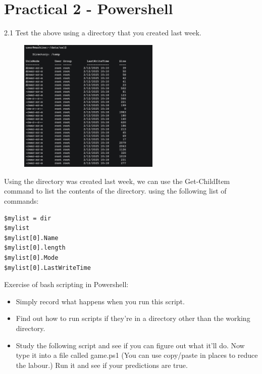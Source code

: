\documentclass[a4paper]{article}
\begin{document}
\section{Practical 2 -  Powershell}

\textcolor{green!50!black}{
    2.1 Test the above using a directory that you created last week.
}

\begin{figure}[H]
    \centering
    \includegraphics[width=0.6\textwidth]{os1.png}
\end{figure}
\noindent
Using the directory was created last week, we can use the Get-ChildItem command to list the contents of the directory.
using the following list of commands:
\begin{verbatim}
$mylist = dir 
$mylist
$mylist[0].Name
$mylist[0].length
$mylist[0].Mode
$mylist[0].LastWriteTime
\end{verbatim}
\noindent
\textcolor{green!50!black}{
Exercise of bash scripting in Powershell:
\begin{itemize}
    \item Simply record what happens when you run this script.
    \item Find out how to run scripts if they’re in a directory other than the working directory.
    \item Study the following script and see if you can figure out what it’ll do. Now type it into a file called game.ps1 (You can use copy/paste in places to reduce the labour.) Run it and see if your predictions are true.
\end{itemize}
}
\end{document}
